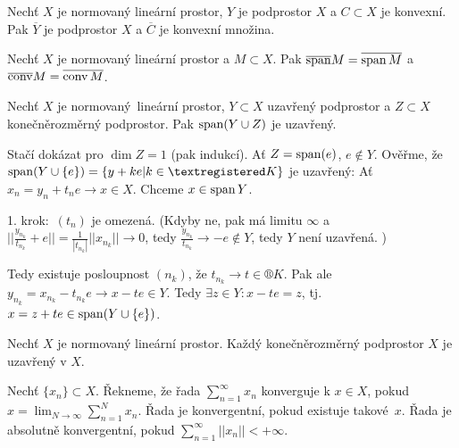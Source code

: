 \documentclass[12pt]{article}					%
\begin{document}
\begin{poznamka}[Fakt]
	Nechť $X$ je normovaný lineární prostor, $Y$ je podprostor $X$ a $C \subset X$ je konvexní. Pak $\overline{Y}$ je podprostor $X$ a $\overline{C}$ je konvexní množina.
\end{poznamka}

\begin{poznamka}[Fakt]
	Nechť $X$ je normovaný lineární prostor a $M \subset X$. Pak $\overline{\operatorname{span}} M = \overline{\operatorname{span} M}$ a $\overline{\operatorname{conv}} M = \overline{\operatorname{conv} M}$.
\end{poznamka}

\begin{veta}
	Nechť $X$ je normovaný lineární prostor, $Y \subset X$ uzavřený podprostor a $Z \subset X$ konečněrozměrný podprostor. Pak $\operatorname{span}(Y \cup Z)$ je uzavřený.

	\begin{dukazin}
		Stačí dokázat pro $\dim Z = 1$ (pak indukcí). Ať $Z = \operatorname{span}(e)$, $e \notin Y$. Ověřme, že $\spn(Y \cup \{e\}) = \{y + ke | k \in ®K\}$ je uzavřený: Ať $x_n = y_n + t_n e \rightarrow x \in X$. Chceme $x \in \operatorname{span} Y$.

		1. krok: $(t_n)$ je omezená. (Kdyby ne, pak má limitu $∞$ a $||\frac{y_{n_k}}{t_{n_k}} + e || = \frac{1}{|t_{n_k}|} ||x_{n_k}|| \rightarrow 0$, tedy $\frac{y_{n_k}}{t_{n_k}} \rightarrow -e \notin Y$, tedy $Y$ není uzavřená. \lightning)

		Tedy existuje posloupnost $(n_k)$, že $t_{n_k} \rightarrow t \in ®K$. Pak ale $y_{n_k} = x_{n_k} - t_{n_k}e \rightarrow x - t e \in Y$. Tedy $\exists z \in Y: x - t e = z$, tj. $x = z + t e \in \operatorname{span}(Y \cup \{e\})$.
	\end{dukazin}
\end{veta}

\begin{dusledek}
	Nechť $X$ je normovaný lineární prostor. Každý konečněrozměrný podprostor $X$ je uzavřený v $X$.
\end{dusledek}


\begin{definice}
	Nechť $\{x_n\} \subset X$. Řekneme, že řada $\sum_{n=1}^∞ x_n$ konverguje k $x \in X$, pokud $x = {\displaystyle \lim_{N \rightarrow ∞}} \sum_{n=1}^N x_n$. Řada je konvergentní, pokud existuje takové $x$. Řada je absolutně konvergentní, pokud $\sum_{n=1}^∞ ||x_n|| < +∞$.
\end{definice}
\end{document}
